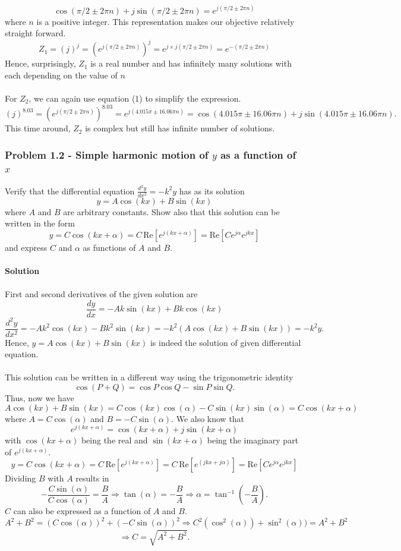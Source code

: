 \documentclass[12pt,a4paper]{article}
\begin{document}
\begin{equation}
    \cos(\pi/2\pm2\pi n)+j\sin(\pi/2\pm2\pi n)=e^{j(\pi/2\pm2\pi n)}
\end{equation}
where $n$ is a positive integer. This representation makes our objective relatively straight forward.
\[Z_1=(j)^j=\left(e^{j(\pi/2\pm2\pi n)}\right)^j=e^{j\times j(\pi/2\pm2\pi n)}=e^{-(\pi/2\pm2\pi n)}\]
Hence, surprisingly, $Z_1$ is a real number and has infinitely many solutions with each depending on the value of $n$
\\
\\For $Z_2$, we can again use equation (1) to simplify the expression.
\[(j)^{8.03}=\left(e^{j(\pi/2\pm2\pi n)}\right)^{8.03}=e^{j(4.015\pi\pm16.06\pi n)}=\cos(4.015\pi\pm16.06\pi n)+j\sin(4.015\pi\pm16.06\pi n).\]
This time around, $Z_2$ is complex but still has infinite number of solutions.

\subsubsection*{Problem 1.2 - Simple harmonic motion of $y$ as a function of $x$}
Verify that the differential equation $\frac{d^2y}{dx^2}=-k^2y$ has as its solution
\[y=A\cos(kx)+B\sin(kx)\]
where $A$ and $B$ are arbitrary constants. Show also that this solution can be written in the form
\[y=C\cos(kx+\alpha)=C\,\text{Re}\left[e^{j(kx+\alpha)}\right]=\text{Re}\left[Ce^{j\alpha}e^{jkx}\right]\]
and express $C$ and $\alpha$ as functions of $A$ and $B$.
\\
\\\textbf{Solution}
\\
\\First and second derivatives of the given solution are
\[\frac{dy}{dx}=-Ak\sin(kx)+Bk\cos(kx)\]
\[\frac{d^2y}{dx^2}=-Ak^2\cos(kx)-Bk^2\sin(kx)=-k^2(A\cos(kx)+B\sin(kx))=-k^2y.\]
Hence, $y=A\cos(kx)+B\sin(kx)$ is indeed the solution of given differential equation.
\\
\\This solution can be written in a different way using the trigonometric identity
\[\cos(P+Q)=\cos P\cos Q-\sin P\sin Q.\]
Thus, now we have
\[A\cos(kx)+B\sin(kx)=C\cos(kx)\cos(\alpha)-C\sin(kx)\sin(\alpha)=C\cos(kx+\alpha)\]
where $A=C\cos(\alpha)$ and $B=-C\sin(\alpha)$.
We also know that
\[e^{j(kx+\alpha)}=\cos(kx+\alpha)+j\sin(kx+\alpha)\]
with $\cos(kx+\alpha)$ being the real and $\sin(kx+\alpha)$ being the imaginary part of $e^{j(kx+\alpha)}$.
\[y=C\cos(kx+\alpha)=C\,\text{Re}\left[e^{j(kx+\alpha)}\right]=C\,\text{Re}\left[e^{(jkx+j\alpha)}\right]=\text{Re}\left[Ce^{j\alpha}e^{jkx}\right]\]
Dividing $B$ with $A$ results in
\[-\frac{C\sin(\alpha)}{C\cos(\alpha)}=\frac{B}{A}\Rightarrow\tan(\alpha)=-\frac{B}{A}\Rightarrow\alpha=\tan^{-1}\left(-\frac{B}{A}\right).\]
$C$ can also be expressed as a function of $A$ and $B$.
\[A^2+B^2=(C\cos(\alpha))^2+(-C\sin(\alpha))^2\Rightarrow C^2(\cos^2(\alpha))+\sin^2(\alpha))=A^2+B^2\]
\[\Rightarrow C=\sqrt{A^2+B^2}.\]
\end{document}
